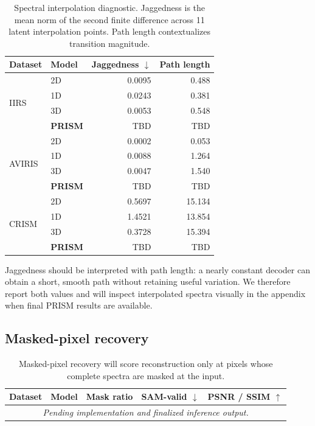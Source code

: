 \documentclass{article}
\newcommand{\tbd}{\textsc{TBD}}
\begin{document}
\begin{table}[t]
\centering
\small
\begin{tabular}{llrr}
\toprule
Dataset & Model & Jaggedness $\downarrow$ & Path length \\
\midrule
\multirow{4}{*}{IIRS}
 & 2D & 0.0095 & 0.488 \\
 & 1D & 0.0243 & 0.381 \\
 & 3D & 0.0053 & 0.548 \\
 & \textbf{PRISM} & \tbd{} & \tbd{} \\
\midrule
\multirow{4}{*}{AVIRIS}
 & 2D & 0.0002 & 0.053 \\
 & 1D & 0.0088 & 1.264 \\
 & 3D & 0.0047 & 1.540 \\
 & \textbf{PRISM} & \tbd{} & \tbd{} \\
\midrule
\multirow{4}{*}{CRISM}
 & 2D & 0.5697 & 15.134 \\
 & 1D & 1.4521 & 13.854 \\
 & 3D & 0.3728 & 15.394 \\
 & \textbf{PRISM} & \tbd{} & \tbd{} \\
\bottomrule
\end{tabular}
\caption{Spectral interpolation diagnostic. Jaggedness is the mean norm of the second finite difference across 11 latent interpolation points. Path length contextualizes transition magnitude.}
\label{tab:interpolation}
\end{table}

Jaggedness should be interpreted with path length: a nearly constant decoder can obtain a short, smooth path without retaining useful variation. We therefore report both values and will inspect interpolated spectra visually in the appendix when final PRISM results are available.

\subsection{Masked-pixel recovery}

\begin{table}[t]
\centering
\small
\begin{tabular}{llrrr}
\toprule
Dataset & Model & Mask ratio & SAM-valid $\downarrow$ & PSNR / SSIM $\uparrow$ \\
\midrule
\multicolumn{5}{c}{\textit{Pending implementation and finalized inference output.}} \\
\bottomrule
\end{tabular}
\caption{Masked-pixel recovery will score reconstruction only at pixels whose complete spectra are masked at the input.}
\label{tab:masked}
\end{table}
\end{document}
